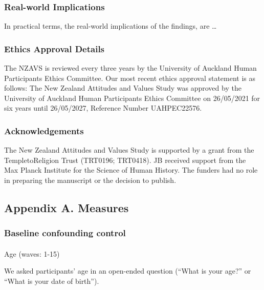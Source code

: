 \documentclass[
  singlecolumn,
  9pt]{article}
\makeatletter
\let\oldparagraph\paragraph
\renewcommand{\paragraph}{
    \@ifstar
      \xxxParagraphStar
      \xxxParagraphNoStar
  }
\newcommand{\xxxParagraphStar}[1]{\oldparagraph*{#1}\mbox{}}
\newcommand{\xxxParagraphNoStar}[1]{\oldparagraph{#1}\mbox{}}
\makeatother
\begin{document}
\subsubsection{Real-world Implications}\label{real-world-implications}

In practical terms, the real-world implications of the findings, are
\ldots{}

\subsubsection{Ethics Approval Details}\label{ethics-approval-details}

The NZAVS is reviewed every three years by the University of Auckland
Human Participants Ethics Committee. Our most recent ethics approval
statement is as follows: The New Zealand Attitudes and Values Study was
approved by the University of Auckland Human Participants Ethics
Committee on 26/05/2021 for six years until 26/05/2027, Reference Number
UAHPEC22576.

\subsubsection{Acknowledgements}\label{acknowledgements}

The New Zealand Attitudes and Values Study is supported by a grant from
the TempletoReligion Trust (TRT0196; TRT0418). JB received support from
the Max Planck Institute for the Science of Human History. The funders
had no role in preparing the manuscript or the decision to publish.

\newpage{}

\subsection{Appendix A. Measures}\label{appendix-a.-measures}

\subsubsection{Baseline confounding
control}\label{baseline-confounding-control}

\paragraph{Age (waves: 1-15)}\label{age-waves-1-15}

We asked participants' age in an open-ended question (``What is your
age?'' or ``What is your date of birth'').
\end{document}
